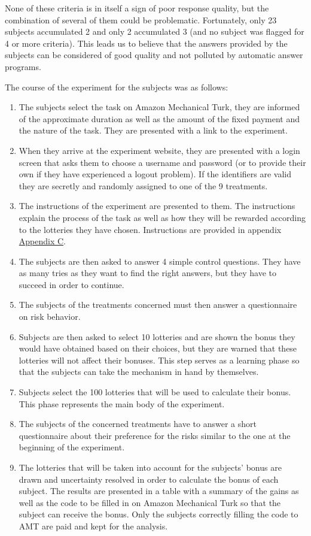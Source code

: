 \documentclass[
]{book}
\providecommand{\tightlist}{%
  \setlength{\itemsep}{0pt}\setlength{\parskip}{0pt}}
\begin{document}
None of these criteria is in itself a sign of poor response quality, but
the combination of several of them could be problematic.
Fortunately, only 23 subjects accumulated 2 and only 2 accumulated 3 (and no
subject was flagged for 4 or more criteria).
This leads us to believe that the answers provided by the
subjects can be considered of good quality and not polluted by
automatic answer programs.

The course of the experiment for the subjects was as follows:

\begin{enumerate}
\def\labelenumi{\arabic{enumi}.}
\tightlist
\item
  The subjects select the task on Amazon Mechanical Turk, they are
  informed of the approximate duration as well as the amount of the
  fixed payment and the nature of the task. They are presented with a
  link to the experiment.
\item
  When they arrive at the experiment website, they are presented with a login
  screen that asks them to choose a username and password (or to
  provide their own if they have experienced a logout problem). If the
  identifiers are valid they are secretly and randomly assigned to one of the 9
  treatments.
\item
  The instructions of the experiment are presented to them. The instructions
  explain the process of the task as well as how they will be rewarded
  according to the lotteries they have chosen.
  Instructions are provided in appendix \protect\hyperlink{expe-instruc4}{Appendix C}.
\item
  The subjects are then asked to answer 4 simple control questions.
  They have as many tries as they want to find the right answers, but
  they have to succeed in order to continue.
\item
  The subjects of the treatments concerned must then answer a
  questionnaire on risk behavior.
\item
  Subjects are then asked to select 10 lotteries and are shown the
  bonus they would have obtained based on their choices, but they are
  warned that these lotteries will not affect their bonuses. This step
  serves as a learning phase so that the subjects can take the
  mechanism in hand by themselves.
\item
  Subjects select the 100 lotteries that will be used to calculate
  their bonus. This phase represents the main body of the experiment.
\item
  The subjects of the concerned treatments have to answer a short
  questionnaire about their preference for the risks similar to the
  one at the beginning of the experiment.
\item
  The lotteries that will be taken into account for the subjects'
  bonus are drawn and uncertainty resolved in order to calculate the bonus of each subject.
  The results are presented in a table with a summary of the gains as
  well as the code to be filled in on Amazon Mechanical Turk so that
  the subject can receive the bonus. Only the subjects correctly filling the code to AMT are paid and kept for the analysis.
\end{enumerate}
\end{document}
